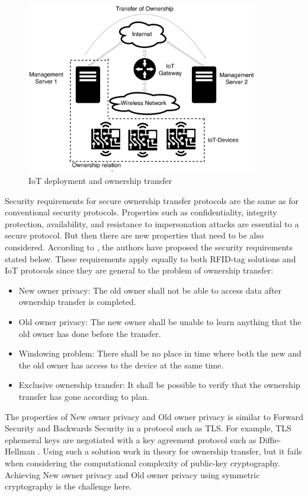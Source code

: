 \begin{figure}[ht]
\centering
\includegraphics[width=0.9\textwidth]{images/IoT_OT.pdf}
\caption{IoT deployment and ownership transfer}
\label{fig:iot-ot}
\end{figure}


Security requirements for secure ownership transfer protocols are the same as for conventional security protocols. Properties such as confidentiality, integrity protection, availability, and resistance to impersonation attacks are essential to a secure protocol. But then there are new properties that need to be also considered. According to \cite{taqieddin2018tag}, the authors have proposed the security requirements stated below. These requirements apply equally to both RFID-tag solutions and IoT protocols since they are general to the problem of ownership transfer:
\begin{itemize}
    \item New owner privacy: The old owner shall not be able to access data after ownership transfer is completed.
    \item Old owner privacy: The new owner shall be unable to learn anything that the old owner has done before the transfer.
    \item Windowing problem: There shall be no place in time where both the new and the old owner has access to the device at the same time.
    \item Exclusive ownership transfer: It shall be possible to verify that the ownership transfer has gone according to plan.
\end{itemize}
The properties of New owner privacy and Old owner privacy is similar to Forward Security and Backwards Security in a protocol such as TLS. For example, TLS ephemeral keys are negotiated with a key agreement protocol such as Diffie-Hellman \cite{diffie1976new}. Using such a solution work in theory for ownership transfer, but it fails when considering the computational complexity of public-key cryptography. Achieving New owner privacy and Old owner privacy using symmetric cryptography is the challenge here. 


